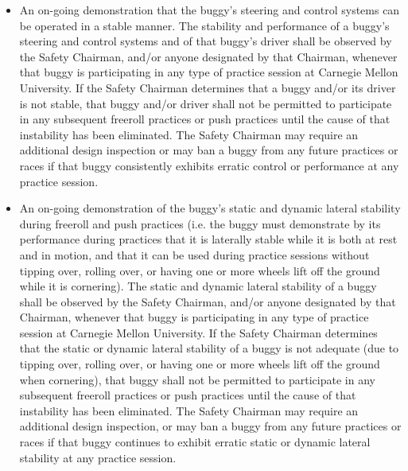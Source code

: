 \begin{itemize}
		\item
		An on-going demonstration that the buggy's steering and control systems can be operated in a stable manner. The stability and performance of a buggy's steering and control systems and of that buggy's driver shall be observed by the Safety Chairman, and/or anyone designated by that Chairman, whenever that buggy is participating in any type of practice session at Carnegie Mellon University. If the Safety Chairman determines that a buggy and/or its driver is not stable, that buggy and/or driver shall not be permitted to participate in any subsequent freeroll practices or push practices until the cause of that instability has been eliminated. The Safety Chairman may require an additional design inspection or may ban a buggy from any future practices or races if that buggy consistently exhibits erratic control or performance at any practice session.

		\item
		An on-going demonstration of the buggy's static and dynamic lateral stability during freeroll and push practices (i.e. the buggy must demonstrate by its performance during practices that it is laterally stable while it is both at rest and in motion, and that it can be used during practice sessions without tipping over, rolling over, or having one or more wheels lift off the ground while it is cornering). The static and dynamic lateral stability of a buggy shall be observed by the Safety Chairman, and/or anyone designated by that Chairman, whenever that buggy is participating in any type of practice session at Carnegie Mellon University. If the Safety Chairman determines that the static or dynamic lateral stability of a buggy is not adequate (due to tipping over, rolling over, or having one or more wheels lift off the ground when cornering), that buggy shall not be permitted to participate in any subsequent freeroll practices or push practices until the cause of that instability has been eliminated. The Safety Chairman may require an additional design inspection, or may ban a buggy from any future practices or races if that buggy continues to exhibit erratic static or dynamic lateral stability at any practice session.

	\end{itemize}



